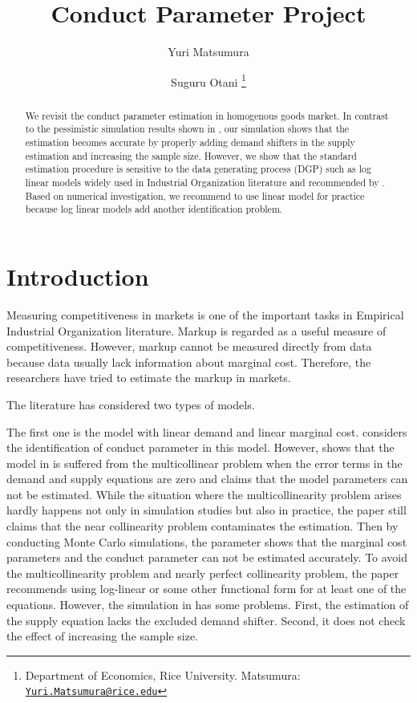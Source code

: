 \documentclass[11pt, a4paper]{article}
\title{Conduct Parameter Project}
\author{Yuri Matsumura \and Suguru Otani \footnote{Department of Economics, Rice University. Matsumura: \texttt{\href{mailto:Yuri.Matsumura@rice.edu}{Yuri.Matsumura@rice.edu}}}}
\begin{document}
\maketitle

\begin{abstract}
    We revisit the conduct parameter estimation in homogenous goods market. In contrast to the pessimistic simulation results shown in \cite{perloff2012collinearity}, our simulation shows that the estimation becomes accurate by properly adding demand shifters in the supply estimation and increasing the sample size. However, we show that the standard estimation procedure is sensitive to the data generating process (DGP) such as log linear models widely used in Industrial Organization literature and recommended by \cite{perloff2012collinearity}. Based on numerical investigation, we recommend to use linear model for practice because log linear models add another identification problem. %
\end{abstract}

\section{Introduction}
Measuring competitiveness in markets is one of the important tasks in Empirical Industrial Organization literature.
Markup is regarded as a useful measure of competitiveness. 
However, markup cannot be measured directly from data because data usually lack information about marginal cost.
Therefore, the researchers have tried to estimate the markup in markets.



The literature has considered two types of models.

The first one is the model with linear demand and linear marginal cost.
\citet{bresnahan1982oligopoly} considers the identification of conduct parameter in this model.
However, \citet{perloff2012collinearity} shows that the model in \citet{bresnahan1982oligopoly} is suffered from the multicollinear problem when the error terms in the demand and supply equations are zero and claims that the model parameters can not be estimated.
While the situation where the multicollinearity problem arises hardly happens not only in simulation studies but also in practice, the paper still claims that the near collinearity problem contaminates the estimation.
Then by conducting Monte Carlo simulations, the parameter shows that the marginal cost parameters and the conduct parameter can not be estimated accurately.
To avoid the multicollinearity problem and nearly perfect collinearity problem, the paper recommends using log-linear or some other functional form for at least one of the equations.
However, the simulation in \cite{perloff2012collinearity} has some problems.
First, the estimation of the supply equation lacks the excluded demand shifter.
Second, it does not check the effect of increasing the sample size.
\end{document}
